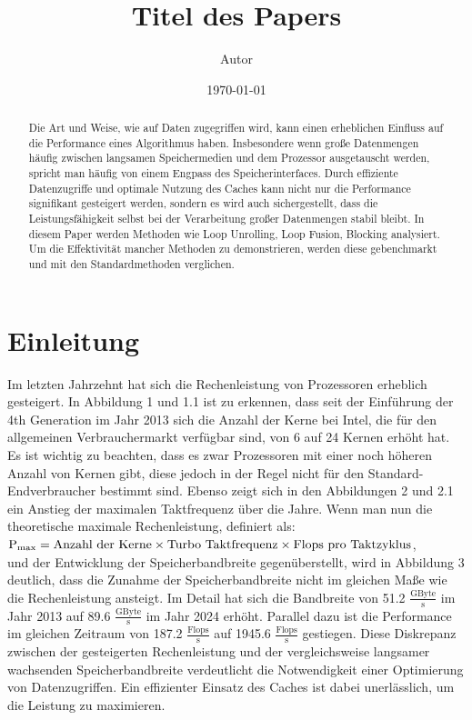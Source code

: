 \documentclass{article}
\title{Titel des Papers}
\author{Autor}
\date{\today}
\begin{document}
\maketitle

\begin{abstract}
    Die Art und Weise, wie auf Daten zugegriffen wird,
    kann einen erheblichen Einfluss auf die Performance eines Algorithmus haben.
    Insbesondere wenn große Datenmengen häufig zwischen langsamen Speichermedien und dem Prozessor ausgetauscht werden,
    spricht man häufig von einem Engpass des Speicherinterfaces.
    Durch effiziente Datenzugriffe und optimale Nutzung des Caches 
    kann nicht nur die Performance signifikant gesteigert werden, 
    sondern es wird auch sichergestellt, 
    dass die Leistungsfähigkeit selbst bei der Verarbeitung großer Datenmengen stabil bleibt.
    In diesem Paper werden Methoden wie Loop Unrolling, Loop Fusion, Blocking analysiert.
    Um die Effektivität mancher Methoden zu demonstrieren, werden diese gebenchmarkt und mit den Standardmethoden verglichen.
\end{abstract}

\section{Einleitung}
    Im letzten Jahrzehnt hat sich die Rechenleistung von Prozessoren erheblich gesteigert. 
    In Abbildung 1 und 1.1 ist zu erkennen, dass seit der Einführung der 4th Generation im Jahr 2013 sich die Anzahl der Kerne bei Intel, 
    die für den allgemeinen Verbrauchermarkt verfügbar sind, von 6 auf 24 Kernen erhöht hat.
    Es ist wichtig zu beachten, dass es zwar Prozessoren mit einer noch höheren Anzahl von Kernen gibt, 
    diese jedoch in der Regel nicht für den Standard-Endverbraucher bestimmt sind. 
    Ebenso zeigt sich in den Abbildungen 2 und 2.1 ein Anstieg der maximalen Taktfrequenz über die Jahre. 
    Wenn man nun die theoretische maximale Rechenleistung, 
    definiert als:\\ $\textnormal{P}_{\textnormal{max}} = \text{Anzahl der Kerne} \times \text{Turbo Taktfrequenz} \times \text{Flops pro Taktzyklus}$,\\und
    der Entwicklung der Speicherbandbreite gegenüberstellt, wird in Abbildung 3 deutlich, 
    dass die Zunahme der Speicherbandbreite nicht im gleichen Maße wie die Rechenleistung ansteigt. 
    Im Detail hat sich die Bandbreite von 51.2 $\frac{\text{GByte}}{\text{s}}$ im Jahr 2013 auf 89.6 $\frac{\text{GByte}}{\text{s}}$ im Jahr 2024 erhöht. 
    Parallel dazu ist die Performance im gleichen Zeitraum von 187.2 $\frac{\text{Flops}}{\text{s}}$ auf 1945.6 $\frac{\text{Flops}}{\text{s}}$ gestiegen. 
    Diese Diskrepanz zwischen der gesteigerten Rechenleistung und der vergleichsweise langsamer wachsenden Speicherbandbreite 
    verdeutlicht die Notwendigkeit einer Optimierung von Datenzugriffen. 
    Ein effizienter Einsatz des Caches ist dabei unerlässlich, um die Leistung zu maximieren.
\end{document}
